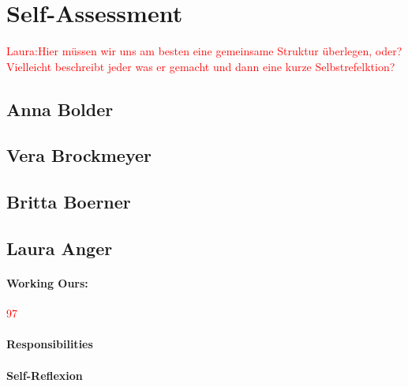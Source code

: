 \section{Self-Assessment} \label{sec:SA} %

\textcolor{red}{Laura:Hier müssen wir uns am besten eine gemeinsame Struktur überlegen, oder? Vielleicht beschreibt jeder was er gemacht und dann eine kurze Selbstrefelktion?}


\subsection{Anna Bolder} \label{sec:SAAnna}



\subsection{Vera Brockmeyer} \label{sec:SAVera}

\subsection{Britta Boerner} \label{sec:SABritta}


\subsection{Laura Anger} \label{sec:SALaura}

\paragraph{Working Ours:} \textcolor{red}{97}
\paragraph{Responsibilities}
\paragraph{Self-Reflexion}

%

\newpage

























